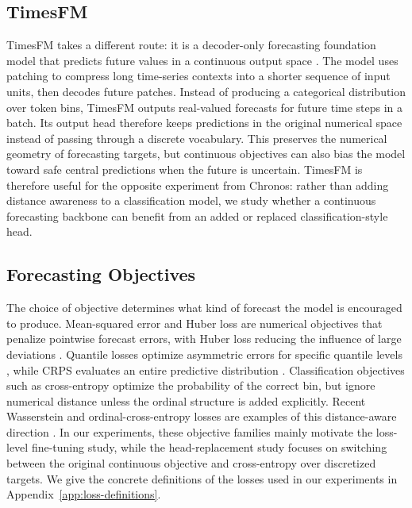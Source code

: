 \documentclass{article}
\begin{document}
\subsection{TimesFM}

TimesFM takes a different route: it is a decoder-only forecasting foundation
model that predicts future values in a continuous output space
\citep{das2024timesfm}.  The model uses patching to compress long time-series
contexts into a shorter sequence of input units, then decodes future patches.
Instead of producing a categorical distribution over token bins, TimesFM outputs
real-valued forecasts for future time steps in a batch.  Its output head
therefore keeps predictions in the original numerical space instead of passing
through a discrete vocabulary.  This preserves the numerical geometry of
forecasting targets, but continuous objectives can also bias the model toward
safe central predictions when the future is uncertain.  TimesFM is therefore
useful for the opposite experiment from Chronos: rather than adding distance
awareness to a classification model, we study whether a continuous forecasting
backbone can benefit from an added or replaced classification-style head.

\subsection{Forecasting Objectives}

The choice of objective determines what kind of forecast the model is encouraged
to produce.  Mean-squared error and Huber loss are numerical objectives that
penalize pointwise forecast errors, with Huber loss reducing the influence of
large deviations \citep{huber1964robust}.  Quantile losses optimize asymmetric
errors for specific quantile levels \citep{koenker1978regression}, while CRPS
evaluates an entire predictive distribution \citep{matheson1976scoring}.
Classification objectives such as cross-entropy optimize the probability of the
correct bin, but ignore numerical distance unless the ordinal structure is added
explicitly.  Recent Wasserstein and ordinal-cross-entropy losses are examples of
this distance-aware direction
\citep{villani2008optimal,chernov2024wasserstein,wang2025ordinalce}.  In our
experiments, these objective families mainly motivate the loss-level fine-tuning
study, while the head-replacement study focuses on switching between the
original continuous objective and cross-entropy over discretized targets.  We
give the concrete definitions of the losses used in our experiments in
Appendix~\ref{app:loss-definitions}.
\end{document}
